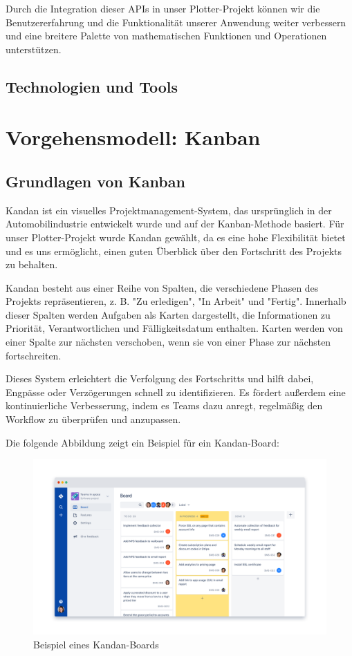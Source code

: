 \documentclass[a4paper]{article}
\begin{document}
Durch die Integration dieser APIs in unser Plotter-Projekt können wir die Benutzererfahrung und die Funktionalität unserer Anwendung weiter verbessern und eine breitere Palette von mathematischen Funktionen und Operationen unterstützen.

\subsection{Technologien und Tools}

\newpage

\section{Vorgehensmodell: Kanban}
\subsection{Grundlagen von Kanban}
Kandan ist ein visuelles Projektmanagement-System, das ursprünglich in der Automobilindustrie entwickelt wurde und auf der Kanban-Methode basiert. Für unser Plotter-Projekt wurde Kandan gewählt, da es eine hohe Flexibilität bietet und es uns ermöglicht, einen guten Überblick über den Fortschritt des Projekts zu behalten.

Kandan besteht aus einer Reihe von Spalten, die verschiedene Phasen des Projekts repräsentieren, z. B. "Zu erledigen", "In Arbeit" und "Fertig". Innerhalb dieser Spalten werden Aufgaben als Karten dargestellt, die Informationen zu Priorität, Verantwortlichen und Fälligkeitsdatum enthalten. Karten werden von einer Spalte zur nächsten verschoben, wenn sie von einer Phase zur nächsten fortschreiten.

Dieses System erleichtert die Verfolgung des Fortschritts und hilft dabei, Engpässe oder Verzögerungen schnell zu identifizieren. Es fördert außerdem eine kontinuierliche Verbesserung, indem es Teams dazu anregt, regelmäßig den Workflow zu überprüfen und anzupassen.

Die folgende Abbildung zeigt ein Beispiel für ein Kandan-Board:

\begin{figure}[h]
	\centering
	\includegraphics[width=1\textwidth]{Resources/kanban_board_example.png}
	\caption{Beispiel eines Kandan-Boards}
	\label{fig:kanban_board_example}
\end{figure}
\end{document}
